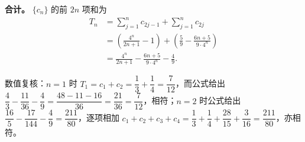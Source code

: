 \begin{answer}
\textbf{合计。} $\{c_n\}$ 的前 $2n$ 项和为
\nopagebreak[4]
\[\begin{aligned}
T_n&=\sum_{j=1}^n c_{2j-1}+\sum_{j=1}^n c_{2j}\\
&=\left(\frac{4^n}{2n+1}-1\right)+\left(\frac59-\frac{6n+5}{9\cdot4^n}\right)\\
&=\frac{4^n}{2n+1}-\frac{6n+5}{9\cdot4^n}-\frac49 .
\end{aligned}\]

数值复核：$n=1$ 时 $T_1=c_1+c_2=\dfrac13+\dfrac14=\dfrac7{12}$，而公式给出 $\dfrac43-\dfrac{11}{36}-\dfrac49=\dfrac{48-11-16}{36}=\dfrac{21}{36}=\dfrac7{12}$，相符；$n=2$ 时公式给出 $\dfrac{16}5-\dfrac{17}{144}-\dfrac49=\dfrac{211}{80}$，逐项相加 $c_1+c_2+c_3+c_4=\dfrac13+\dfrac14+\dfrac{28}{15}+\dfrac3{16}=\dfrac{211}{80}$，亦相符。




\end{answer}
